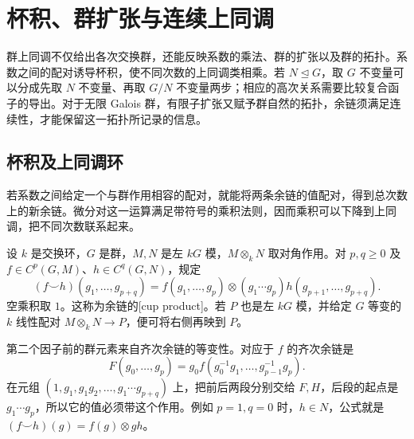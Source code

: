 
\section{杯积、群扩张与连续上同调}
\label{b4:sec:1104}

群上同调不仅给出各次交换群，还能反映系数的乘法、群的扩张以及群的拓扑。系数之间的配对诱导杯积，使不同次数的上同调类相乘。若 \(N\trianglelefteq G\)，取 \(G\) 不变量可以分成先取 \(N\) 不变量、再取 \(G/N\) 不变量两步；相应的高次关系需要比较复合函子的导出。对于无限 Galois 群，有限子扩张又赋予群自然的拓扑，余链须满足连续性，才能保留这一拓扑所记录的信息。

%
%
%

\subsection{杯积及上同调环}
\label{b4:subsec:1104:01}

若系数之间给定一个与群作用相容的配对，就能将两条余链的值配对，得到总次数上的新余链。微分对这一运算满足带符号的乘积法则，因而乘积可以下降到上同调，把不同次数联系起来。

\begin{definition}\label{b4:def:group-cup-product}
	设 \(k\) 是交换环，\(G\) 是群，\(M,N\) 是左 \(kG\) 模，\(M\otimes_kN\) 取对角作用。对 \(p,q\ge0\) 及 \(f\in C^p(G,M)\)、\(h\in C^q(G,N)\)，规定
	\[
		(f\smile h)(g_1,\ldots,g_{p+q}) =f(g_1,\ldots,g_p)\otimes (g_1\cdots g_p)h(g_{p+1},\ldots,g_{p+q}).
	\]
	空乘积取 \(1\)。这称为余链的[cup product]。若 \(P\) 也是左 \(kG\) 模，并给定 \(G\) 等变的 \(k\) 线性配对 \(M\otimes_kN\to P\)，便可将右侧再映到 \(P\)。
\end{definition}

第二个因子前的群元素来自齐次余链的等变性。对应于 \(f\) 的齐次余链是
\[
	F(g_0,\ldots,g_p) =g_0f(g_0^{-1}g_1,\ldots,g_{p-1}^{-1}g_p).
\]
在元组 \((1,g_1,g_1g_2,\ldots,g_1\cdots g_{p+q})\) 上，把前后两段分别交给 \(F,H\)，后段的起点是 \(g_1\cdots g_p\)，所以它的值必须带这个作用。例如 \(p=1,q=0\) 时，\(h\in N\)，公式就是 \((f\smile h)(g)=f(g)\otimes gh\)。

